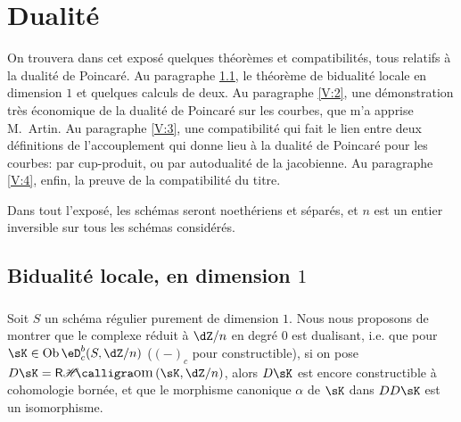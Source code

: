 
\chapter{Dualité}\label{V}




















On trouvera dans cet exposé quelques théorèmes et compatibilités, tous 
relatifs à la dualité de Poincaré. Au paragraphe \ref{V:1}, le théorème de 
bidualité locale en dimension $1$ \cite[I.5.1]{sga5} et quelques calculs de 
deux. Au paragraphe \ref{V:2}, une démonstration très économique de la dualité 
de Poincaré sur les courbes, que m'a apprise M.\ Artin. Au paragraphe 
\ref{V:3}, une compatibilité qui fait le lien entre deux définitions de 
l'accouplement qui donne lieu à la dualité de Poincaré pour les courbes: par 
cup-produit, ou par autodualité de la jacobienne. Au paragraphe \ref{V:4}, 
enfin, la preuve de la compatibilité du titre. 

Dans tout l'exposé, les schémas seront noethériens et séparés, et $n$ 
est un entier inversible sur tous les schémas considérés. 










\section{Bidualité locale, en dimension \texorpdfstring{$1$}{1}}\label{V:1}





\subsection{}\label{V:1-1}

Soit $S$ un schéma régulier purement de dimension $1$. Nous nous proposons 
de montrer que le complexe réduit à $\dZ/n$ en degré $0$ est 
dualisant, i.e. que pour $\sK\in \ob\eD_c^b(S,\dZ/n)$ ($(-)_c$ pour 
constructible), si on pose $D\sK=\rHom(\sK,\dZ/n)$, alors $D\sK$ est encore 
constructible à cohomologie bornée, et que le morphisme canonique $\alpha$ 
de $\sK$ dans $D D\sK$ est un isomorphisme. 

